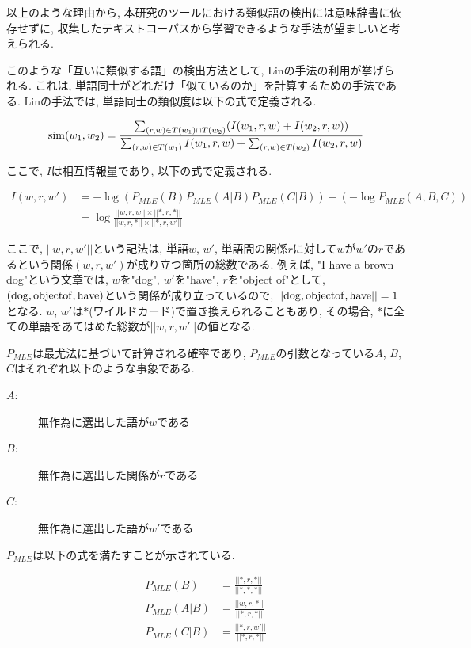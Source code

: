 \documentclass[12pt]{jarticle}
\begin{document}
以上のような理由から, 本研究のツールにおける類似語の検出には意味辞書に依存せずに, 収集したテキストコーパスから学習できるような手法が望ましいと考えられる. 

このような「互いに類似する語」の検出方法として, Linの手法\cite{DekangLin}の利用が挙げられる. これは, 単語同士がどれだけ「似ているのか」を計算するための手法である. Linの手法では, 単語同士の類似度は以下の式で定義される. 

\begin{equation}
  {\rm sim}(w_1, w_2) = \frac{\sum_{(r,w)\in T(w_1)\cap T(w_2)} (I(w_1, r, w) + I(w_2, r, w))}{\sum_{(r,w) \in T(w_1)}I(w_1, r, w) + \sum_{(r,w) \in T(w_2)}I(w_2, r, w)}
\end{equation}

ここで, $I$は相互情報量であり, 以下の式で定義される. 

\begin{align}
I(w, r, w') & = -\log(P_{MLE}(B)P_{MLE}(A|B)P_{MLE}(C|B))-(-\log P_{MLE}(A,B,C)) \\
 & = \log \frac{||w,r,w||\times||*,r,*||}{||w,r,*||\times||*,r,w'||}
\end{align}

ここで, $||w, r, w'||$という記法は, 単語$w$, $w'$, 単語間の関係$r$に対して$w$が$w'$の$r$であるという関係$(w, r, w')$が成り立つ箇所の総数である. 例えば, "I have a brown dog"という文章では, $w$を"dog", $w'$を"have", $r$を"object of"として, $\rm (dog, objectof, have)$という関係が成り立っているので, $\rm||dog, object of, have||=1$となる. 
$w$, $w'$は$*$(ワイルドカード)で置き換えられることもあり, その場合, $*$に全ての単語をあてはめた総数が$||w, r, w'||$の値となる. 

$P_{MLE}$は最尤法に基づいて計算される確率であり, $P_{MLE}$の引数となっている$A$, $B$, $C$はそれぞれ以下のような事象である. 

\begin{description}
  \item[$A$:]無作為に選出した語が$w$である
  \item[$B$:]無作為に選出した関係が$r$である
  \item[$C$:]無作為に選出した語が$w'$である
\end{description}

$P_{MLE}$は以下の式を満たすことが示されている. 

\begin{align}
  P_{MLE}(B)   & = \frac{||*, r, *||}{||*, *, *||}\\
  P_{MLE}(A|B) & = \frac{||w, r, *||}{||*, r, *||}\\
  P_{MLE}(C|B) & = \frac{||*, r,w'||}{||*, r, *||}
\end{align}
\end{document}
